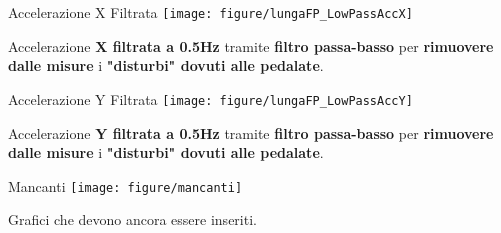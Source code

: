 \documentclass[a4paper, 9pt]{beamer}
\begin{document}
	\begin{frame}{{Accelerazione X Filtrata}}
		\centering\texttt{[image: figure/lungaFP\_LowPassAccX]}	\vspace{.05\textheight}
		
		Accelerazione \textbf{X filtrata a 0.5Hz} tramite \textbf{filtro passa-basso} per \textbf{rimuovere dalle misure} i \textbf{"disturbi" dovuti alle pedalate}.
	\end{frame}
	
	\begin{frame}{{Accelerazione Y Filtrata}}
		\centering\texttt{[image: figure/lungaFP\_LowPassAccY]}	\vspace{.05\textheight}
		
		Accelerazione \textbf{Y filtrata a 0.5Hz} tramite \textbf{filtro passa-basso} per \textbf{rimuovere dalle misure} i \textbf{"disturbi" dovuti alle pedalate}.
	\end{frame}
	
	\begin{frame}{{Mancanti}}
		\centering\texttt{[image: figure/mancanti]}
		\vspace{.05\textheight}
		
		Grafici che devono ancora essere inseriti.
		
		
	\end{frame}
	
	
\end{document}
